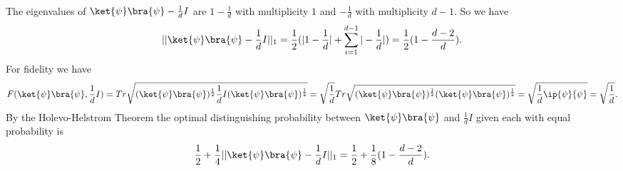 \documentclass[letterpaper,12pt,oneside,onecolumn]{article}
\begin{document}
\paragraph{}
The eigenvalues of $\ket{\psi}\bra{\psi} - \frac{1}{d}I$ are $1-\frac{1}{d}$ with multiplicity $1$ and $-\frac{1}{d}$ with multiplicity $d-1$.
So we have $$||\ket{\psi}\bra{\psi} - \frac{1}{d}I ||_1 = \frac{1}{2} (|1-\frac{1}{d}| + \sum_{i=1}^{d-1} |-\frac{1}{d}|) = \frac{1}{2}(1 - \frac{d-2}{d}).$$
For fidelity we have
$$F(\ket{\psi}\bra{\psi}, \frac{1}{d}I) = Tr\sqrt{(\ket{\psi}\bra{\psi})^\frac{1}{2}\frac{1}{d}I (\ket{\psi}\bra{\psi})^\frac{1}{2} } = \sqrt{\frac{1}{d}}Tr\sqrt{(\ket{\psi}\bra{\psi})^\frac{1}{2}(\ket{\psi}\bra{\psi})^\frac{1}{2}} = \sqrt{\frac{1}{d}\ip{\psi}{\psi}} = \sqrt{\frac{1}{d}}.$$
By the Holevo-Helstrom Theorem the optimal distinguishing probability between $\ket{\psi}\bra{\psi}$ and $\frac{1}{d}I$ given each with equal probability is
$$\frac{1}{2} + \frac{1}{4}||\ket{\psi}\bra{\psi} - \frac{1}{d}I ||_1 = \frac{1}{2} + \frac{1}{8}(1 - \frac{d-2}{d}).$$
\section{}
\end{document}
